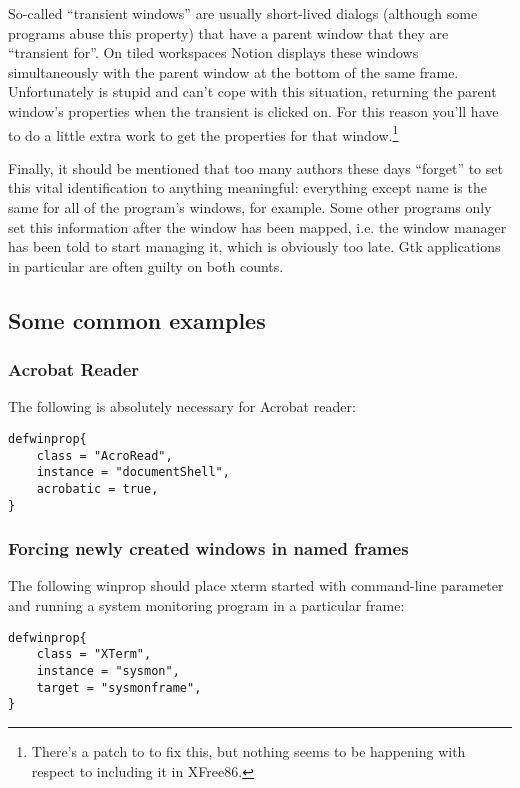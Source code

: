 So-called ``transient windows'' are usually short-lived dialogs (although
some programs abuse this property) that have a parent window that they are
``transient for''. On tiled workspaces Notion displays these windows 
simultaneously with the parent window at the bottom of the same frame.
Unfortunately  is stupid and can't cope with this situation,
returning the parent window's properties when the transient is clicked on.
For this reason you'll have to do a little extra work to get the properties
for that window.\footnote{There's a patch to  to
fix this, but nothing seems to be happening with respect to including it in 
XFree86.}

Finally, it should be mentioned that too many authors these days
``forget'' to set this vital identification to anything meaningful:
everything except name is the same for all of the program's 
windows, for example. Some other programs only set this information
after the window has been mapped, i.e. the window manager has been
told to start managing it, which is obviously too late. 
Gtk applications in particular are often guilty on both counts.


\subsection{Some common examples}

\subsubsection{Acrobat Reader}

The following is absolutely necessary for Acrobat reader:

\begin{verbatim}
defwinprop{
    class = "AcroRead",
    instance = "documentShell",
    acrobatic = true,
}
\end{verbatim}

\subsubsection{Forcing newly created windows in named frames}

The following winprop should place xterm started with command-line parameter
\mbox{} and running a system monitoring program in a
particular frame:
\begin{verbatim}
defwinprop{
    class = "XTerm",
    instance = "sysmon",
    target = "sysmonframe",
}
\end{verbatim}


